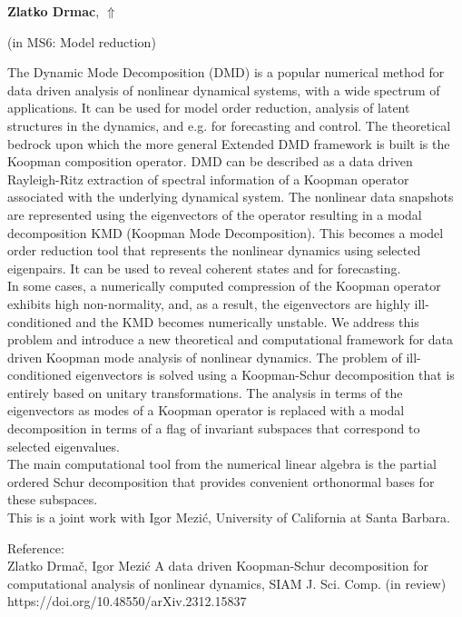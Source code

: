 \documentclass[ILAS2025-program.tex]{subfiles}
\begin{document}
     \hypertarget{down0131}{}\begin{ilasabstract}
    
    \textbf{Zlatko Drmac},  \hfill \hyperlink{up0131}{$\Uparrow$}
    
    (in {\color{mstitle}MS6: Model reduction})
        
        \mtskip
    The Dynamic Mode Decomposition (DMD) is a popular numerical method
for data driven analysis of nonlinear dynamical systems, with a wide spectrum 
of applications. It can be used for model order reduction, analysis of
latent structures in the dynamics, and e.g. for forecasting and control.  The
theoretical bedrock upon which the more general Extended DMD framework 
is built is the Koopman composition operator.
%
DMD can be described as a data driven Rayleigh-Ritz extraction of spectral information
of a Koopman operator associated with the underlying dynamical system. 
The nonlinear data snapshots are represented using the eigenvectors of the
operator resulting in a modal decomposition KMD (Koopman Mode Decomposition).
This becomes a model order reduction tool that represents the nonlinear dynamics
using selected eigenpairs. It can be used to reveal coherent states and for forecasting. \\
In some cases, a numerically computed compression of the Koopman operator exhibits 
high non-normality, and, as a result, the eigenvectors are highly ill-conditioned and the
KMD becomes numerically unstable.
%
We address this problem and introduce a new theoretical and computational framework for
data driven Koopman mode analysis of nonlinear dynamics. The 
problem of ill-conditioned eigenvectors  is solved using a Koopman-Schur 
decomposition that is entirely 
based on unitary transformations. The analysis in terms of the eigenvectors as 
modes of a Koopman operator  is replaced with a modal decomposition 
in terms of a flag of invariant subspaces that correspond to selected eigenvalues. 
  \\
%
The main computational tool from the numerical linear algebra is the partial 
ordered Schur decomposition that provides convenient orthonormal bases for these 
subspaces. \\
%
This is a joint work with Igor Mezi\'{c}, University of California at Santa Barbara.
%

Reference:\\
Zlatko Drma\v{c}, Igor Mezi\'{c} A data driven Koopman-Schur decomposition for 
computational analysis of nonlinear dynamics, SIAM J. Sci. Comp. (in review)\\
https://doi.org/10.48550/arXiv.2312.15837



\end{ilasabstract}
\end{document}
